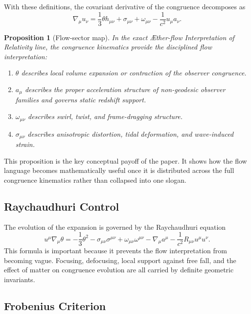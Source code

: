 \documentclass[11pt]{article}
\newcommand{\Aflow}{\AE{}ther-flow}
\newcommand{\TheoryName}{\Aflow{} Interpretation of Relativity}
\newtheorem{proposition}{Proposition}
\begin{document}
With these definitions, the covariant derivative of the congruence decomposes as
\begin{equation}
\nabla_\mu u_\nu
=
\frac{1}{3}\theta h_{\mu\nu}
+
\sigma_{\mu\nu}
+
\omega_{\mu\nu}
-\frac{1}{c^2}u_\mu a_\nu.
\label{eq:flowdecomp}
\end{equation}

\begin{proposition}[Flow-sector map]
In the exact \TheoryName{} line, the congruence kinematics provide the disciplined flow interpretation:
\begin{enumerate}
    \item \(\theta\) describes local volume expansion or contraction of the observer congruence.
    \item \(a_\mu\) describes the proper acceleration structure of non-geodesic observer families and governs static redshift support.
    \item \(\omega_{\mu\nu}\) describes swirl, twist, and frame-dragging structure.
    \item \(\sigma_{\mu\nu}\) describes anisotropic distortion, tidal deformation, and wave-induced strain.
\end{enumerate}
\end{proposition}

This proposition is the key conceptual payoff of the paper. It shows how the flow language becomes mathematically useful once it is distributed across the full congruence kinematics rather than collapsed into one slogan.

\subsection{Raychaudhuri Control}

The evolution of the expansion is governed by the Raychaudhuri equation \cite{Raychaudhuri1955}
\begin{equation}
u^\mu \nabla_\mu \theta
=
-\frac{1}{3}\theta^2
-\sigma_{\mu\nu}\sigma^{\mu\nu}
+\omega_{\mu\nu}\omega^{\mu\nu}
-\nabla_\mu a^\mu
-\frac{1}{c^2}R_{\mu\nu}u^\mu u^\nu.
\label{eq:raychaudhuri}
\end{equation}
This formula is important because it prevents the flow interpretation from becoming vague. Focusing, defocusing, local support against free fall, and the effect of matter on congruence evolution are all carried by definite geometric invariants.

\subsection{Frobenius Criterion}
\end{document}
